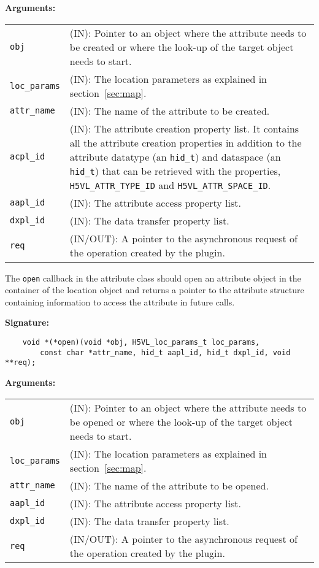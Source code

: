 \textbf{Arguments:}\\
\begin{tabular}{l p{10cm}}
  {\tt obj} & (IN): Pointer to an object where the attribute needs
  to be created or where the look-up of the target object needs to
  start.\\
  {\tt loc\_params} & (IN): The location parameters as explained in
  section~\ref{sec:map}.\\
  {\tt attr\_name} & (IN): The name of the attribute to be created.\\
  {\tt acpl\_id} & (IN): The attribute creation property list. It contains
  all the attribute creation properties in addition to the attribute
  datatype (an {\tt hid\_t}) and dataspace (an {\tt hid\_t}) that can
  be retrieved with the properties, {\tt H5VL\_ATTR\_TYPE\_ID} and
  {\tt H5VL\_ATTR\_SPACE\_ID}.\\
  {\tt aapl\_id} & (IN): The attribute access property list.\\
  {\tt dxpl\_id} & (IN): The data transfer property list.\\
  {\tt req} & (IN/OUT): A pointer to the asynchronous request of the
  operation created by the plugin.\\
\end{tabular}

The {\tt open} callback in the attribute class should open an
attribute object in the container of the location object and returns a
pointer to the attribute structure containing information to access
the attribute in future calls. 

\textbf{Signature:}
\begin{lstlisting}
    void *(*open)(void *obj, H5VL_loc_params_t loc_params, 
        const char *attr_name, hid_t aapl_id, hid_t dxpl_id, void **req);
\end{lstlisting}

\textbf{Arguments:}\\
\begin{tabular}{l p{10cm}}
  {\tt obj} & (IN): Pointer to an object where the attribute needs to be
  opened or where the look-up of the target object needs to start.\\
  {\tt loc\_params} & (IN): The location parameters as explained in
  section~\ref{sec:map}.\\
  {\tt attr\_name} & (IN): The name of the attribute to be opened.\\
  {\tt aapl\_id} & (IN): The attribute access property list.\\
  {\tt dxpl\_id} & (IN): The data transfer property list.\\
  {\tt req} & (IN/OUT): A pointer to the asynchronous request of the
  operation created by the plugin.\\
\end{tabular}

